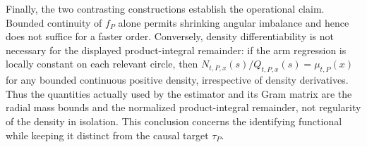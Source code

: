 Finally, the two contrasting constructions establish the operational claim.  Bounded continuity of \(f_P\) alone permits shrinking angular imbalance and hence does not suffice for a faster order.  Conversely, density differentiability is not necessary for the displayed product-integral remainder: if the arm regression is locally constant on each relevant circle, then \(N_{t,P,x}(s)/Q_{t,P,x}(s)=\mu_{t,P}(x)\) for any bounded continuous positive density, irrespective of density derivatives.  Thus the quantities actually used by the estimator and its Gram matrix are the radial mass bounds and the normalized product-integral remainder, not regularity of the density in isolation.  This conclusion concerns the identifying functional while keeping it distinct from the causal target \(\tau_P\).